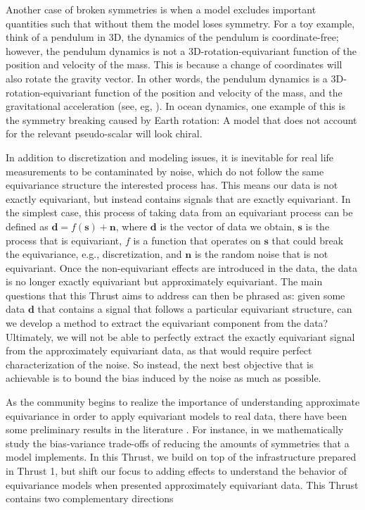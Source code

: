 \documentclass[11pt]{article}
\begin{document}
Another case of broken symmetries is when a model excludes important quantities such that without them the model loses symmetry. For a toy example, think of a pendulum in 3D, the dynamics of the pendulum is coordinate-free; however, the pendulum dynamics is not a 3D-rotation-equivariant function of the position and velocity of the mass. This is because a change of coordinates will also rotate the gravity vector. In other words, the pendulum dynamics is a 3D-rotation-equivariant function of the position and velocity of the mass, and the gravitational acceleration (see, eg, \cite{villar2023passive}). In ocean dynamics, one example of this is the symmetry breaking caused by Earth rotation: A model that does not account for the relevant pseudo-scalar will look chiral.

In addition to discretization and modeling issues, it is inevitable for real life measurements to be contaminated by noise, which do not follow the same equivariance structure the interested process has. This means our data is not exactly equivariant, but instead contains signals that are exactly equivariant. In the simplest case, this process of taking data from an equivariant process can be defined as $\mathbf{d} = f(\mathbf{s}) + \mathbf{n}$, where $\mathbf{d}$ is the vector of data we obtain, $\mathbf{s}$ is the process that is equivariant, $f$ is a function that operates on $\mathbf{s}$ that could break the equivariance, e.g., discretization, and $\mathbf{n}$ is the random noise that is not equivariant.
Once the non-equivariant effects are introduced in the data, the data is no longer exactly equivariant but approximately equivariant.
The main questions that this Thrust aims to address can then be phrased as: given some data $\mathbf{d}$ that contains a signal that follows a particular equivariant structure, can we develop a method to extract the equivariant component from the data? Ultimately, we will not be able to perfectly extract the exactly equivariant signal from the approximately equivariant data, as that would require perfect characterization of the noise. So instead, the next best objective that is achievable is to bound the bias induced by the noise as much as possible. 

As the community begins to realize the importance of understanding approximate equivariance in order to apply equivariant models to real data, there have been some preliminary results in the literature \cite{Wang2022ApproximatelyEN, huang2021traffic}. For instance, in \cite{huang2024approximately} we mathematically study the bias-variance trade-offs of reducing the amounts of symmetries that a model implements. 
In this Thrust, we build on top of the infrastructure prepared in Thrust 1, but shift our focus to adding effects to understand the behavior of equivariance models when presented approximately equivariant data. This Thrust contains two complementary directions  
\end{document}
